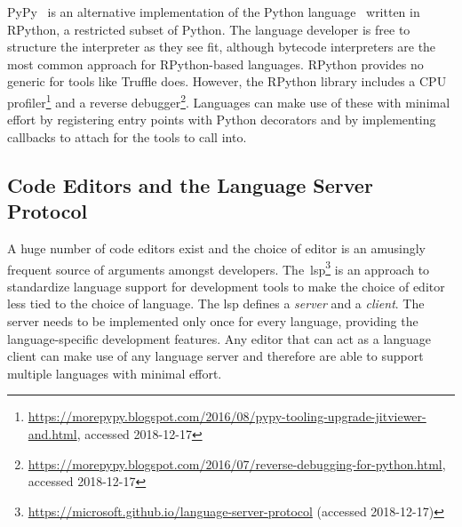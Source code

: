 \documentclass[sigplan,10pt,screen]{acmart}
\begin{document}
PyPy~\cite{rigo2006pypy} is an alternative implementation of the Python
language~\cite{Rossum1995} written in RPython, a restricted subset of Python.
The language developer is free to structure the interpreter as
they see fit, although bytecode interpreters are the most common approach for
RPython-based languages. %
RPython provides no generic \api for tools like Truffle does. However, the
RPython library includes a CPU
profiler\footnote{\url{https://morepypy.blogspot.com/2016/08/pypy-tooling-upgrade-jitviewer-and.html},
  accessed 2018-12-17} and a reverse
debugger\footnote{\url{https://morepypy.blogspot.com/2016/07/reverse-debugging-for-python.html},
  accessed 2018-12-17}. Languages can make use of these with minimal effort by
registering entry points with Python decorators and by implementing callbacks to
attach for the tools to call into.

\subsection{Code Editors and the Language Server Protocol}
\label{sec:contextSourceCodeEditors}

A huge number of code editors exist and the choice of editor is an amusingly
frequent source of arguments amongst
developers. The~\ac{lsp}\footnote{\url{https://microsoft.github.io/language-server-protocol}
  (accessed 2018-12-17)}
is an approach to standardize language support for development tools to make the
choice of editor less tied to the choice of language. The \ac{lsp} defines a
\emph{server} and a \emph{client}. The server needs to be implemented only once
for every language, providing the language-specific development features. Any
editor that can act as a language client can make use of any language server and
therefore are able to support multiple languages with minimal effort.
\end{document}
